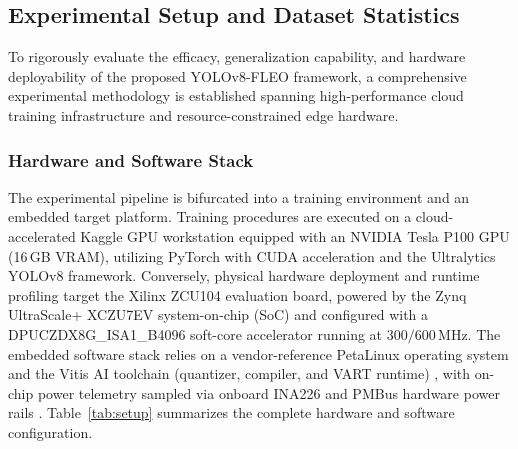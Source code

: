 \documentclass[algorithms,article,submit,moreauthors]{Definitions/mdpi}
\begin{document}
\subsection{Experimental Setup and Dataset Statistics}
\label{sec:exp_setup}

To rigorously evaluate the efficacy, generalization capability, and hardware deployability of the proposed YOLOv8-FLEO framework, a comprehensive experimental methodology is established spanning high-performance cloud training infrastructure and resource-constrained edge hardware. 

\subsubsection{Hardware and Software Stack}

The experimental pipeline is bifurcated into a training environment and an embedded target platform. Training procedures are executed on a cloud-accelerated Kaggle GPU workstation equipped with an NVIDIA Tesla P100 GPU (16\,GB VRAM), utilizing PyTorch with CUDA acceleration and the Ultralytics YOLOv8 framework. Conversely, physical hardware deployment and runtime profiling target the Xilinx ZCU104 evaluation board, powered by the Zynq UltraScale+ XCZU7EV system-on-chip (SoC) \citep{bib2} and configured with a DPUCZDX8G\_ISA1\_B4096 soft-core accelerator running at $300/600\,$MHz. The embedded software stack relies on a vendor-reference PetaLinux operating system and the Vitis AI toolchain (quantizer, compiler, and VART runtime) \citep{bib1}, with on-chip power telemetry sampled via onboard INA226 and PMBus hardware power rails \citep{bib3}. Table~\ref{tab:setup} summarizes the complete hardware and software configuration.

\begin{table}[h!]
\centering
\caption{Hardware and software configuration for training and edge deployment.}
\label{tab:setup}
\end{table}
\end{document}
